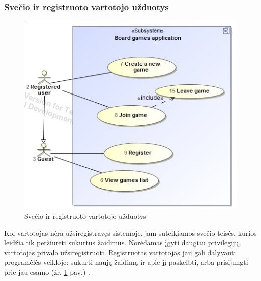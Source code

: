 \documentclass{VUMIFPSkursinis}
\begin{document}
	
	\subsubsection{Svečio ir registruoto vartotojo užduotys}
		\begin{figure}[H]
			\centering
			\includegraphics[scale=0.6]{img/UzduociuDiagrama1}
			\caption{Svečio ir registruoto vartotojo užduotys}
			\label{img:UzduociuDiagrama1}
		\end{figure}
		Kol vartotojas nėra užsiregistravęs sistemoje, jam suteikiamos svečio teisės, kurios leidžia tik peržiūrėti sukurtus žaidimus. Norėdamas įgyti daugiau privilegijų, vartotojas privalo užsiregistruoti. Registruotas vartotojas jau gali dalyvauti programėlės veikloje: sukurti naują žaidimą ir apie jį paskelbti, arba prisijungti prie jau esamo (žr. \ref{img:UzduociuDiagrama1} pav.) .
\end{document}
